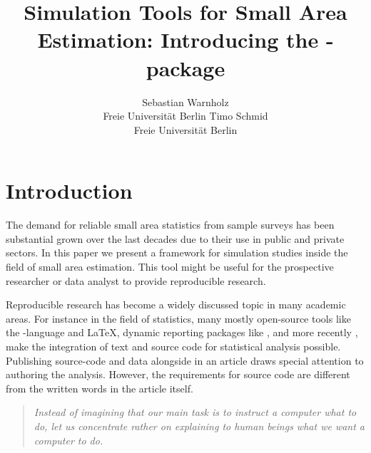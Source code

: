 \documentclass[article]{ajs}
\author{Sebastian Warnholz\\ Freie Universit\"at Berlin \And 
        Timo Schmid \\ Freie Universit\"at Berlin}
\title{Simulation Tools for Small Area Estimation: Introducing the \proglang{R}-package \proglang{saeSim}}
\begin{document}
%
%
%
\section{Introduction}
The demand for reliable small area statistics from sample surveys has been substantial grown over the last decades due to their use in public and private sectors. In this paper we present a framework for simulation studies inside the field of small area estimation. This tool might be useful for the prospective researcher or data analyst to provide reproducible research.  

Reproducible research has become a widely discussed topic in many academic areas. For instance in the field of statistics, many mostly open-source tools like the -language \citep{r14} and \LaTeX, dynamic reporting packages like  \citep{yihui13},  \citep{leisch02} and more recently  \citep{allaire14}, make the integration of text and source code for statistical analysis possible. Publishing source-code and data alongside in an article draws special attention to authoring the analysis. However, the requirements for source code are different from the written words in the article itself. 

\begin{quote}
\textit{Instead of imagining that our main task is to instruct a computer what to do, let us concentrate rather on explaining to human beings what we want a computer to do.} \cite[p.99]{knuth92} 
\end{quote} 
\end{document}

